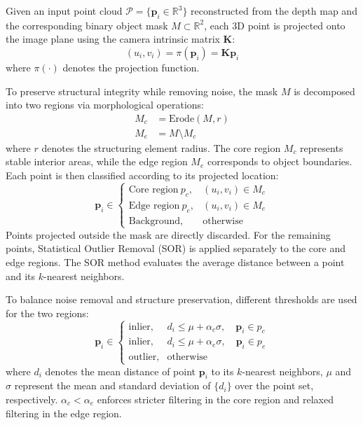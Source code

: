 \documentclass[letterpaper, 10 pt, journal, twoside]{IEEEtran}  %
\begin{document}
  Given an input point cloud $\mathcal{P} = \{ \mathbf{p}_i \in \mathbb{R}^3 \}$ reconstructed from the depth map and the corresponding binary object mask $M \subset \mathbb{R}^2$, each 3D point is projected onto the image plane using the camera intrinsic matrix $\mathbf{K}$:
  \begin{equation}
  	(u_i, v_i) = \pi(\mathbf{p}_i) = \mathbf{K} \mathbf{p}_i
  \end{equation}
  where $\pi(\cdot)$ denotes the projection function.
  
  To preserve structural integrity while removing noise, the mask $M$ is decomposed into two regions via morphological operations:
  \begin{align}
  	M_c &= \mathrm{Erode}(M, r) \\
  	M_e &= M \setminus M_c
  \end{align}
  where $r$ denotes the structuring element radius. The core region $M_c$ represents stable interior areas, while the edge region $M_e$ corresponds to object boundaries.
  Each point is then classified according to its projected location:
  \[
  \mathbf{p}_i \in 
  \begin{cases}
  	\text{Core region}\ p_c, & (u_i, v_i) \in M_c \\
  	\text{Edge region}\ p_e, & (u_i, v_i) \in M_e \\
  	\text{Background}, & \text{otherwise}
  \end{cases}
  \]
  Points projected outside the mask are directly discarded. For the remaining points, Statistical Outlier Removal (SOR) is applied separately to the core and edge regions. The SOR method evaluates the average distance between a point and its $k$-nearest neighbors.
  
  To balance noise removal and structure preservation, different thresholds are used for the two regions:
  \begin{equation}
  	\mathbf{p}_i \in
  	\begin{cases}
  		\text{inlier}, & d_i \leq \mu + \alpha_c \sigma, \quad \mathbf{p}_i \in p_c \\
  		\text{inlier}, & d_i \leq \mu + \alpha_e \sigma, \quad \mathbf{p}_i \in p_e \\
  		\text{outlier}, & \text{otherwise}
  	\end{cases}
  \end{equation}
  where $d_i$ denotes the mean distance of point $\mathbf{p}_i$ to its $k$-nearest neighbors, $\mu$ and $\sigma$ represent the mean and standard deviation of $\{d_i\}$ over the point set, respectively. $\alpha_c < \alpha_e$ enforces stricter filtering in the core region and relaxed filtering in the edge region.
  
\end{document}
